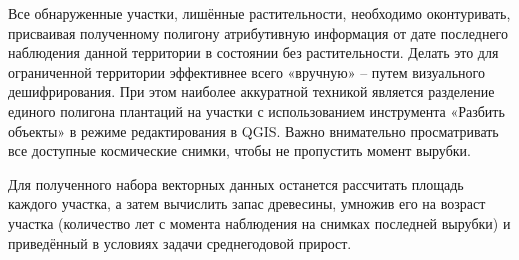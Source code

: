 Все обнаруженные участки, лишённые растительности, необходимо оконтуривать, присваивая полученному полигону атрибутивную информация от дате последнего наблюдения данной территории в состоянии без растительности. Делать это для ограниченной территории эффективнее всего «вручную» – путем визуального дешифрирования. При этом наиболее аккуратной техникой является разделение единого полигона плантаций на участки с использованием инструмента «Разбить объекты» в режиме редактирования в QGIS. Важно внимательно просматривать все доступные космические снимки, чтобы не пропустить момент вырубки.

Для полученного набора векторных данных останется рассчитать площадь каждого участка, а затем вычислить запас древесины, умножив его на возраст участка (количество лет с момента наблюдения на снимках последней вырубки) и приведённый в условиях задачи среднегодовой прирост.

